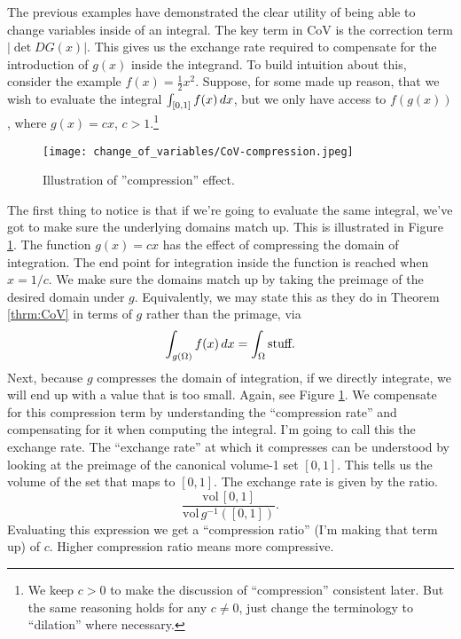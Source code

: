 The previous examples have demonstrated the clear utility of being able to change variables inside of an integral. The key term in CoV is the correction term $\left| \det DG(x) \right| $. This gives us the exchange rate required to compensate for the introduction of $g(x)$ inside the integrand. To build intuition about this, consider the example $f(x) = \frac{1}{2}x^2$. Suppose, for some made up reason, that we wish to evaluate the integral $\int_{[0,1]} f(x)\, dx$, but we only have access to $f(g(x))$, where $g(x) = cx$, $c>1$.\footnote{We keep $c>0$ to make the discussion of ``compression'' consistent later. But the same reasoning holds for any $c\not=0$, just change the terminology to ``dilation'' where necessary.}
\begin{figure}[h] \label{fig:cov-compression}
\centering
\centering
\texttt{[image: change\_of\_variables/CoV-compression.jpeg]}
\caption{Illustration of ''compression'' effect.}
\end{figure}
The first thing to notice is that if we're going to evaluate the same integral, we've got to make sure the underlying domains match up. This is illustrated in Figure \ref{fig:cov-compression}. The function $g(x) = cx$ has the effect of compressing the domain of integration. The end point for integration inside the function is reached when $x=1/c$.  We make sure the domains match up by taking the preimage of the desired domain under $g$. Equivalently, we may state this as they do in Theorem \ref{thrm:CoV} in terms of $g$ rather than the primage, via 
$$
\int_{g(\Omega)} f(x)\, dx = \int_{\Omega} \mbox{stuff}.
$$
Next, because $g$ compresses the domain of integration, if we directly integrate, we will end up with a value that is too small. Again, see Figure \ref{fig:cov-compression}. We compensate for this compression term by understanding the ``compression rate'' and compensating for it when computing the integral. I'm going to call this the exchange rate. The ``exchange rate'' at which it compresses can be understood by looking at the preimage of the canonical volume-1 set $[0,1]$. This tells us the volume of the set that maps to $[0,1]$. The exchange rate is given by the ratio. 
$$
\frac{\mbox{vol}\, [0,1]}{\mbox{vol} \, g^{-1}([0, 1])}.
$$
Evaluating this expression we get a ``compression ratio'' (I'm making that term up) of $c$. Higher compression ratio means more compressive. 
